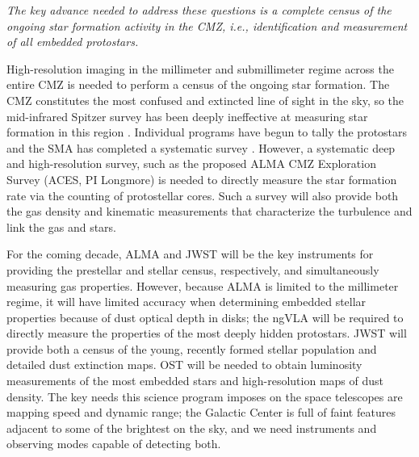 \documentclass[modern]{aastex62}
\begin{document}
{\it
The key advance needed to address these questions is a complete census of the
ongoing star formation activity in the CMZ, i.e., identification and measurement
of all embedded protostars.}

High-resolution imaging in the millimeter and submillimeter regime across the
entire CMZ is needed to perform a census of the ongoing star formation.  The
CMZ constitutes the most confused and extincted line of sight in the sky, so
the mid-infrared Spitzer survey has been deeply ineffective at measuring star
formation in this region \citep{Koepferl2014a}. Individual programs have
begun to tally the protostars \citep[Walker et al, in prep, Barnes et al, in
prep]{Ginsburg2018a,Lu2019a} and the SMA has completed a systematic
survey \citep{Battersby2017b}. However, a systematic deep and high-resolution
survey, such as the proposed ALMA CMZ Exploration Survey (ACES, PI Longmore) is
needed to directly measure the star formation rate via the counting of
protostellar cores. Such a survey will also provide both the gas density and
kinematic measurements that characterize the turbulence and link the gas and
stars.


For the coming decade, ALMA and JWST will be the key instruments for providing
the prestellar and stellar census, respectively, and simultaneously measuring
gas properties.  However, because ALMA is limited to the millimeter regime,
it will have limited accuracy when determining embedded stellar properties because
of dust optical depth in disks; the ngVLA will be required to directly measure
the properties of the most deeply hidden protostars.  JWST will provide both
a census of the young, recently formed stellar population and detailed dust 
extinction maps.  OST will be needed to obtain luminosity measurements of the
most embedded stars and high-resolution maps of dust density.  The key needs
this science program imposes on the space telescopes are mapping speed
and dynamic range; the Galactic Center is full of faint features adjacent
to some of the brightest on the sky, and we need instruments and observing
modes capable of detecting both.
\end{document}
